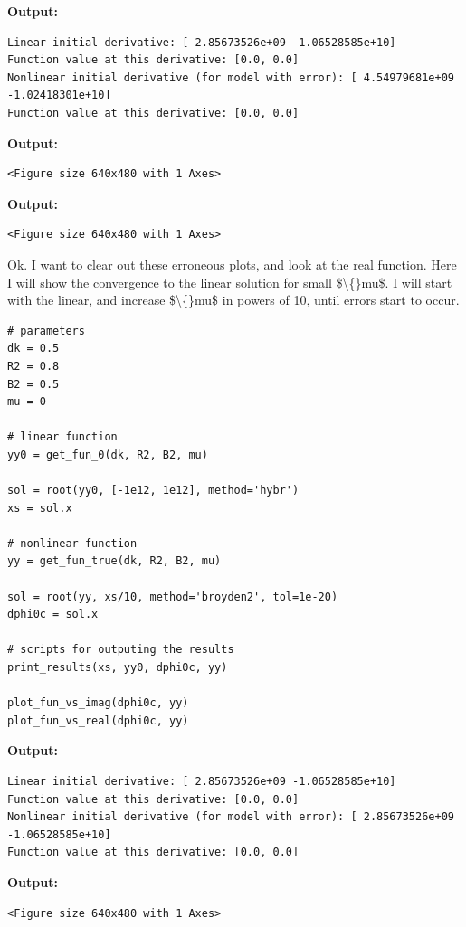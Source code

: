 \documentclass{article}
\begin{document}
\textbf{Output:}\begin{verbatim}
Linear initial derivative: [ 2.85673526e+09 -1.06528585e+10]
Function value at this derivative: [0.0, 0.0]
Nonlinear initial derivative (for model with error): [ 4.54979681e+09 -1.02418301e+10]
Function value at this derivative: [0.0, 0.0]

\end{verbatim}

\textbf{Output:}\begin{verbatim}
<Figure size 640x480 with 1 Axes>
\end{verbatim}

\textbf{Output:}\begin{verbatim}
<Figure size 640x480 with 1 Axes>
\end{verbatim}

Ok. I want to clear out these erroneous plots, and look at the real function. Here I will show the convergence to the linear solution for small \$\textbackslash\{\}mu\$. I will start with the linear, and increase \$\textbackslash\{\}mu\$ in powers of 10, until errors start to occur.

\begin{lstlisting}
# parameters
dk = 0.5
R2 = 0.8
B2 = 0.5
mu = 0

# linear function
yy0 = get_fun_0(dk, R2, B2, mu)

sol = root(yy0, [-1e12, 1e12], method='hybr')
xs = sol.x

# nonlinear function
yy = get_fun_true(dk, R2, B2, mu)

sol = root(yy, xs/10, method='broyden2', tol=1e-20)
dphi0c = sol.x

# scripts for outputing the results
print_results(xs, yy0, dphi0c, yy)

plot_fun_vs_imag(dphi0c, yy)
plot_fun_vs_real(dphi0c, yy)\end{lstlisting}

\textbf{Output:}\begin{verbatim}
Linear initial derivative: [ 2.85673526e+09 -1.06528585e+10]
Function value at this derivative: [0.0, 0.0]
Nonlinear initial derivative (for model with error): [ 2.85673526e+09 -1.06528585e+10]
Function value at this derivative: [0.0, 0.0]

\end{verbatim}

\textbf{Output:}\begin{verbatim}
<Figure size 640x480 with 1 Axes>
\end{verbatim}
\end{document}
